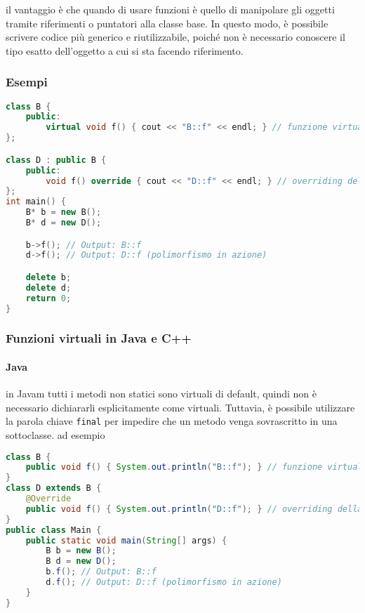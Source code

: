 \documentclass{report}
\begin{document}
il vantaggio è che quando di usare funzioni  è quello di manipolare gli oggetti tramite riferimenti o puntatori alla classe base. In questo modo, è possibile scrivere codice più generico e riutilizzabile, poiché non è necessario conoscere il tipo esatto dell'oggetto a cui si sta facendo riferimento.

\subsubsection{Esempi}

\begin{lstlisting}[language=C++]
class B {
    public:
        virtual void f() { cout << "B::f" << endl; } // funzione virtuale
};

class D : public B {
    public:
        void f() override { cout << "D::f" << endl; } // overriding della funzione virtuale
};
int main() {
    B* b = new B();
    B* d = new D();

    b->f(); // Output: B::f
    d->f(); // Output: D::f (polimorfismo in azione)

    delete b;
    delete d;
    return 0;
}
\end{lstlisting}

\subsubsection{Funzioni virtuali in Java e C++}
\paragraph{Java}
in Javam tutti i metodi non statici sono virtuali di default, quindi non è necessario dichiararli esplicitamente come virtuali. Tuttavia, è possibile utilizzare la parola chiave \texttt{final} per impedire che un metodo venga sovrascritto in una sottoclasse. ad esempio
\begin{lstlisting}[language=Java]
class B {
    public void f() { System.out.println("B::f"); } // funzione virtuale
}
class D extends B {
    @Override
    public void f() { System.out.println("D::f"); } // overriding della funzione virtuale
}
public class Main {
    public static void main(String[] args) {
        B b = new B();
        B d = new D();
        b.f(); // Output: B::f
        d.f(); // Output: D::f (polimorfismo in azione)
    }
}
\end{lstlisting}
\end{document}
